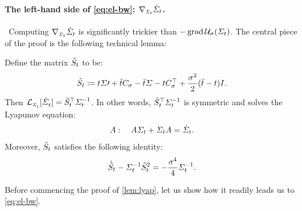 \paragraph{The left-hand side of \eqref{eq:el-bw}: $\nabla_{\scriptscriptstyle\dot{\Sigma}_{t}}\dot{\Sigma}_{t}$.}
~Computing $\nabla_{\scriptscriptstyle\dot{\Sigma}_{t}}\dot{\Sigma}_{t}$ is significantly trickier than $-\gradBW\penergyBW$. The central piece of the proof is the following technical lemma:
\begin{lemma}
\label{lem:lyap}
Define the matrix $\tilde{S}_{t}$ to be:
\begin{equation}
\label{eq:Ht}
\tilde{S}_{t} \coloneqq t\Sigma\prime + \bar{t} C_{\sigma} - \bar{t}\Sigma - tC_{\sigma}^\top + \frac{\sigma^2}{2}(\bar{t}-t)I.
\end{equation}Then $\lyap = \Ht^\top \Sigcurveinv$. In other words, $\tilde{S}_{t}^\top \Sigma^{-1}_{t}$ is symmetric and solves the Lyapunov equation:
\begin{equation}
  A: \quad  A\Sigma_{t} + \Sigma_{t} A= \dot{\Sigma}_{t}.
\end{equation}
Moreover, $\tilde{S}_{t}$ satisfies the following identity:
\begin{equation}
\label{eq:ht-id}
\dot{\tilde{S}}_{t} - \Sigma^{-1}_{t} \tilde{S}_{t}^2 =- \frac{\sigma^4}{4} \Sigma^{-1}_{t}.
\end{equation}

\end{lemma}

Before commencing the proof of \cref{lem:lyap}, let us show how it readily leads us to \eqref{eq:el-bw}.


